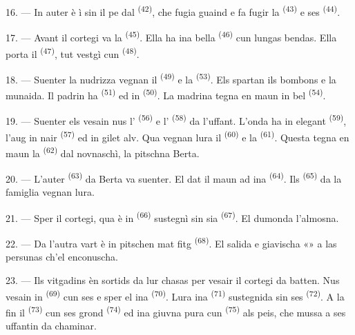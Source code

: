 16. --- In auter è ì sin il pe dal  \textsuperscript{(42)}, che fugia
guaind e fa fugir la  \textsuperscript{(43)} e ses 
\textsuperscript{(44)}.

\VUsaut{5.0mm}
\VUsaut{4.0mm}

17. --- Avant il cortegi va la  \textsuperscript{(45)}. Ella ha ina
bella  \textsuperscript{(46)} cun lungas bendas. Ella porta il
 \textsuperscript{(47)}, tut vestgì cun 
\textsuperscript{(48)}.

18. --- Suenter la nudrizza vegnan il  \textsuperscript{(49)} e la
 \textsuperscript{(53)}. Els spartan ils bombons e la munaida. Il
padrin ha  \textsuperscript{(51)} ed in 
\textsuperscript{(50)}. La madrina tegna en maun in bel 
\textsuperscript{(54)}.

19. --- Suenter els vesain nus l' \textsuperscript{(56)} e l'
\textsuperscript{(58)} da l'uffant. L'onda ha in elegant 
\textsuperscript{(59)}, l'aug in nair  \textsuperscript{(57)} ed in
gilet alv. Qua vegnan lura il  \textsuperscript{(60)} e la
 \textsuperscript{(61)}. Questa tegna en maun la 
\textsuperscript{(62)} dal novnaschì, la pitschna Berta.

20. --- L'auter  \textsuperscript{(63)} da Berta va suenter. El dat il
maun ad ina  \textsuperscript{(64)}. Ils 
\textsuperscript{(65)} da la famiglia vegnan lura.

\VUsaut{4.6mm}
\VUsaut{3.4mm}

21. --- Sper il cortegi, qua è in  \textsuperscript{(66)} sustegnì
sin sia  \textsuperscript{(67)}. El dumonda l'almosna.

22. --- Da l'autra vart è in pitschen mat fitg 
\textsuperscript{(68)}. El salida e giavischa «» a las persunas
ch'el enconuscha.

23. --- Ils vitgadins èn sortids da lur chasas per vesair il cortegi da batten. Nus
vesain in  \textsuperscript{(69)} cun ses  e sper
el ina  \textsuperscript{(70)}. Lura ina 
\textsuperscript{(71)} sustegnida sin ses  \textsuperscript{(72)}. A la
fin il  \textsuperscript{(73)} cun ses grond 
\textsuperscript{(74)} ed ina giuvna pura cun 
\textsuperscript{(75)} als peis, che mussa a ses uffantin da chaminar.


